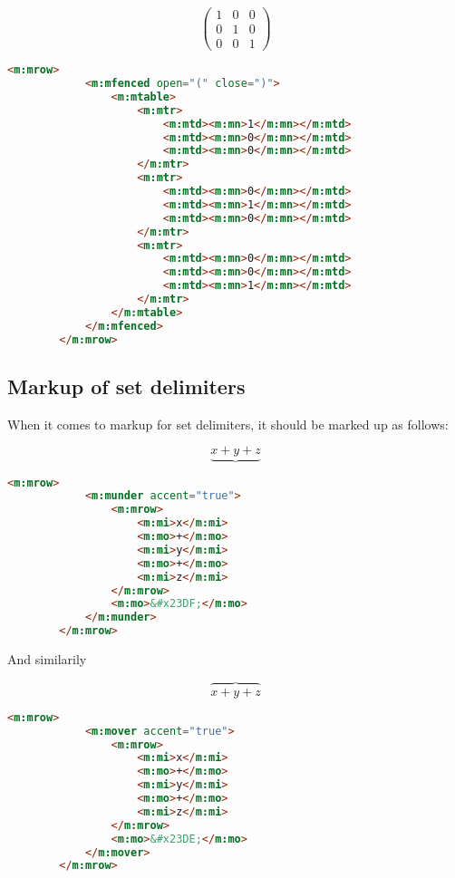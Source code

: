\documentclass[english,a4paper,11pt]{article}
\begin{document}
\begin{examples}
	\begin{equation}
	\begin{pmatrix}
		1 & 0 & 0\\
		0 & 1 & 0\\
		0 & 0 & 1
	\end{pmatrix}
	\end{equation}

	\begin{lstlisting}[language=HTML]
		<m:mrow>
			<m:mfenced open="(" close=")">
				<m:mtable>
					<m:mtr>
						<m:mtd><m:mn>1</m:mn></m:mtd>
						<m:mtd><m:mn>0</m:mn></m:mtd>
						<m:mtd><m:mn>0</m:mn></m:mtd>
					</m:mtr>
					<m:mtr>
						<m:mtd><m:mn>0</m:mn></m:mtd>
						<m:mtd><m:mn>1</m:mn></m:mtd>
						<m:mtd><m:mn>0</m:mn></m:mtd>
					</m:mtr>
					<m:mtr>
						<m:mtd><m:mn>0</m:mn></m:mtd>
						<m:mtd><m:mn>0</m:mn></m:mtd>
						<m:mtd><m:mn>1</m:mn></m:mtd>
					</m:mtr>
				</m:mtable>
			</m:mfenced>
	  	</m:mrow>
	\end{lstlisting}
\end{examples}

\subsection{Markup of set delimiters}

When it comes to markup for set delimiters, it should be marked up as follows:

\begin{examples}
	\begin{equation}
		\underbrace{x+y+z}
	\end{equation}

	\begin{lstlisting}[language=HTML]
		<m:mrow>
			<m:munder accent="true">
				<m:mrow>
					<m:mi>x</m:mi>
					<m:mo>+</m:mo>
					<m:mi>y</m:mi>
					<m:mo>+</m:mo>
					<m:mi>z</m:mi>
				</m:mrow>
				<m:mo>&#x23DF;</m:mo>
			</m:munder>
	  	</m:mrow>
	\end{lstlisting}


And similarily

	\begin{equation}
		\overbrace{x+y+z}
	\end{equation}

	\begin{lstlisting}[language=HTML]
		<m:mrow>
			<m:mover accent="true">
				<m:mrow>
					<m:mi>x</m:mi>
					<m:mo>+</m:mo>
					<m:mi>y</m:mi>
					<m:mo>+</m:mo>
					<m:mi>z</m:mi>
				</m:mrow>
				<m:mo>&#x23DE;</m:mo>
			</m:mover>
	  	</m:mrow>
	\end{lstlisting}
\end{examples}
\end{document}
